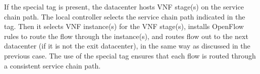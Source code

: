 If the special tag is present, the datacenter hosts VNF stage(s) on the service chain path. %
The local controller selects the service chain path indicated in the tag. Then it selects VNF instance(s) for the VNF stage(s), installs OpenFlow rules to route the flow through the instance(s), and routes flow out to the next datacenter (if it is not the exit datacenter), in the same way as discussed in the previous case. The use of the special tag ensures that each flow is routed through a consistent service chain path.




